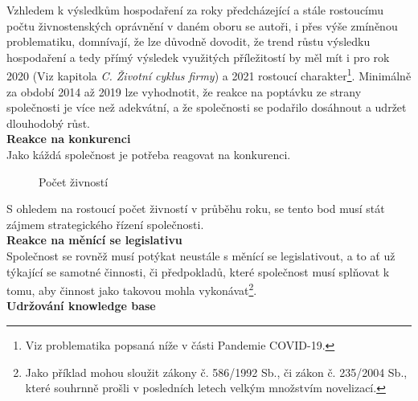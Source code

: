 \newpage

 Vzhledem k výsledkům hospodaření za roky předcházející a stále rostoucímu počtu živnostenských oprávnění v daném oboru se autoři, i přes výše zmíněnou problematiku, domnívají, že lze důvodně dovodit, že trend růstu výsledku hospodaření a tedy přímý výsledek využitých příležitostí by měl mít i pro rok 2020 (Viz kapitola \textit{C. Životní cyklus firmy}) a 2021 rostoucí charakter\footnote{Viz problematika popsaná níže v části Pandemie COVID-19.}. Minimálně za období 2014 až 2019 lze vyhodnotit, že reakce na poptávku ze strany společnosti je více než adekvátní, a že společnosti se podařilo dosáhnout a udržet dlouhodobý růst.\\



\textbf{Reakce na konkurenci}\\

Jako káždá společnost je potřeba reagovat na konkurenci.

\begin{figure}[!htbp]
	\caption[Počet živností]{Počet živností}
	\label{fig:Pocet zivnosti}
\end{figure}

S ohledem na rostoucí počet živností v průběhu roku, se tento bod musí stát zájmem strategického řízení společnosti.\\

\textbf{Reakce na měnící se legislativu}\\

Společnost se rovněž musí potýkat neustále s měnící se legislativout, a to ať už týkající se samotné činnosti, či předpokladů, které společnost musí splňovat k tomu, aby činnost jako takovou mohla vykonávat\footnote{Jako příklad mohou sloužit zákony č. 586/1992 Sb., či zákon č. 235/2004 Sb., které souhrnně prošli v posledních letech velkým množstvím novelizací.}.\\

\textbf{Udržování knowledge base}\\

